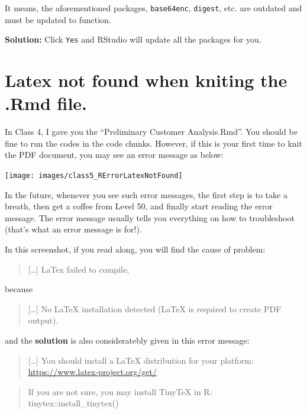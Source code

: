 \documentclass[
  11pt,
]{book}
\begin{document}
It means, the aforementioned packages, \texttt{base64enc}, \texttt{digest}, etc. are outdated and must be updated to function.

\textbf{Solution:} Click \texttt{Yes} and RStudio will update all the packages for you.

\hypertarget{latex-not-found-when-kniting-the-.rmd-file.}{%
\section{Latex not found when kniting the .Rmd file.}\label{latex-not-found-when-kniting-the-.rmd-file.}}

In Class 4, I gave you the ``Preliminary Customer Analysis.Rmd''. You should be fine to run the codes in the code chunks. However, if this is your first time to knit the PDF document, you may see an error message as below:

\begin{center}\texttt{[image: images/class5\_RErrorLatexNotFound]} \end{center}

In the future, whenever you see such error messages, the first step is to take a breath, then get a coffee from Level 50, and finally start reading the error message. The error message usually tells you everything on how to troubleshoot (that's what an error message is for!).

In this screenshot, if you read along, you will find the cause of problem:

\begin{quote}
{[}\ldots{]} LaTex failed to compile,
\end{quote}

because

\begin{quote}
{[}\ldots{]} No LaTeX installation detected (LaTeX is required to create PDF output).
\end{quote}

and the \textbf{solution} is also consideratebly given in this error message:

\begin{quote}
{[}\ldots{]} You should install a LaTeX distribution for your platform: \url{https://www.latex-project.org/get/}
\end{quote}

\begin{quote}
If you are not sure, you may install TinyTeX in R: tinytex::install\_tinytex()
\end{quote}
\end{document}
